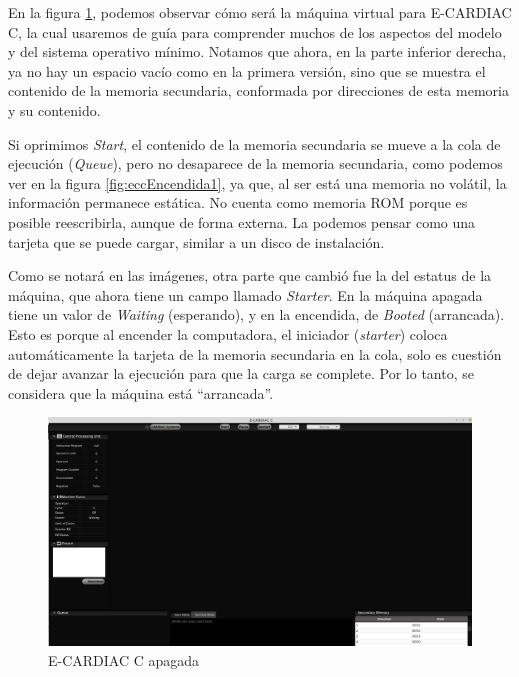 \documentclass[letterpaper,12pt,oneside]{book}
\begin{document}
		En la figura \ref{fig:eccApagada}, podemos observar  cómo será la máquina virtual para E-CARDIAC C, 
		la cual usaremos de guía para comprender 
		muchos de los aspectos del modelo y del sistema operativo mínimo. 
		Notamos que ahora, en la parte inferior derecha, ya no hay un espacio vacío como en la primera versión, sino que se muestra
		el contenido de la memoria secundaria, conformada por direcciones de esta memoria y su contenido.
  
        Si oprimimos \textit{Start},
		el contenido de la memoria secundaria se mueve a la cola de ejecución (\textit{Queue}), pero no desaparece de la memoria secundaria, como podemos
		ver en la figura \ref{fig:eccEncendida1}, ya que, al ser está una memoria no volátil, la información permanece estática. No cuenta como memoria 
		ROM porque es posible
		reescribirla, aunque de forma externa. La podemos pensar como una tarjeta que se puede cargar, similar
		a un disco de instalación.
  
        Como se notará en las imágenes, otra parte que cambió fue la del estatus de
		la máquina, que ahora tiene un campo llamado \textit{Starter}. En la máquina apagada tiene un valor de \textit{Waiting} (esperando), y 
		en la encendida, de \textit{Booted} (arrancada). Esto
		es porque al encender la computadora, el iniciador (\textit{starter}) coloca automáticamente la tarjeta de la memoria secundaria en la cola, 
		solo 
		es cuestión de dejar avanzar la ejecución para que la carga se complete. Por lo tanto, se considera que la máquina está ``arrancada''.

		\begin{figure}[h]		
			\centering
			\includegraphics[scale=0.32]{media/CARDIACC/ECARDIACC_apagada.png}
			\caption{E-CARDIAC C apagada}
			\label{fig:eccApagada}
		\end{figure}		
		
\end{document}
